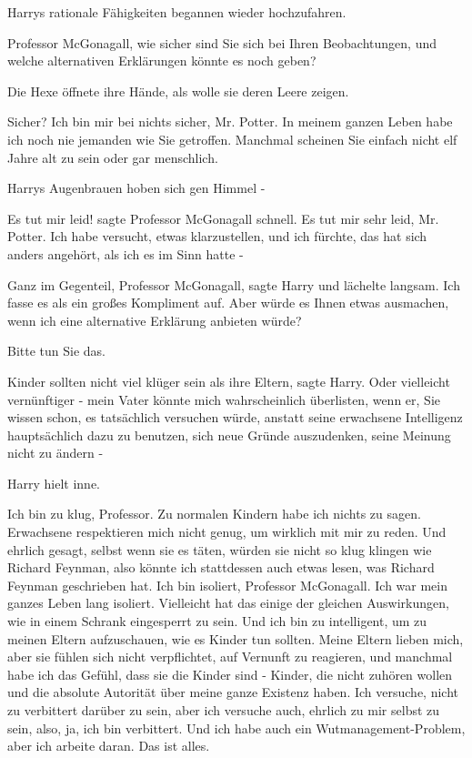Harrys rationale Fähigkeiten begannen wieder hochzufahren.

\glqq Professor McGonagall, wie sicher sind Sie sich bei Ihren Beobachtungen,
und welche alternativen Erklärungen könnte es noch geben?\grqq{}

Die Hexe öffnete ihre Hände, als wolle sie deren Leere zeigen.

\glqq Sicher? Ich bin mir bei nichts sicher, Mr. Potter. In meinem ganzen Leben
habe ich noch nie jemanden wie Sie getroffen. Manchmal scheinen Sie einfach
nicht elf Jahre alt zu sein oder gar menschlich.\grqq{}

Harrys Augenbrauen hoben sich gen Himmel -

\glqq Es tut mir leid!\grqq{} sagte Professor McGonagall schnell. \glqq Es tut
mir sehr leid, Mr. Potter. Ich habe versucht, etwas klarzustellen, und ich
fürchte, das hat sich anders angehört, als ich es im Sinn hatte -\grqq{}

\glqq Ganz im Gegenteil, Professor McGonagall\grqq{}, sagte Harry und lächelte
langsam. \glqq Ich fasse es als ein großes Kompliment auf. Aber würde es Ihnen
etwas ausmachen, wenn ich eine alternative Erklärung anbieten würde?\grqq{}

\glqq Bitte tun Sie das.\grqq{}

\glqq Kinder sollten nicht viel klüger sein als ihre Eltern\grqq{}, sagte Harry.
\glqq Oder vielleicht vernünftiger - mein Vater könnte mich wahrscheinlich
überlisten, wenn er, Sie wissen schon, es tatsächlich versuchen würde, anstatt
seine erwachsene Intelligenz hauptsächlich dazu zu benutzen, sich neue Gründe
auszudenken, seine Meinung nicht zu ändern -\grqq{}

Harry hielt inne.

\glqq Ich bin zu klug, Professor. Zu normalen Kindern habe ich nichts zu sagen.
Erwachsene respektieren mich nicht genug, um wirklich mit mir zu reden. Und
ehrlich gesagt, selbst wenn sie es täten, würden sie nicht so klug klingen wie
Richard Feynman, also könnte ich stattdessen auch etwas lesen, was Richard
Feynman geschrieben hat. Ich bin isoliert, Professor McGonagall. Ich war mein
ganzes Leben lang isoliert. Vielleicht hat das einige der gleichen Auswirkungen,
wie in einem Schrank eingesperrt zu sein. Und ich bin zu intelligent, um zu
meinen Eltern aufzuschauen, wie es Kinder tun sollten. Meine Eltern lieben mich,
aber sie fühlen sich nicht verpflichtet, auf Vernunft zu reagieren, und manchmal
habe ich das Gefühl, dass sie die Kinder sind - Kinder, die nicht zuhören wollen
und die absolute Autorität über meine ganze Existenz haben. Ich versuche, nicht
zu verbittert darüber zu sein, aber ich versuche auch, ehrlich zu mir selbst zu
sein, also, ja, ich bin verbittert. Und ich habe auch ein Wutmanagement-Problem,
aber ich arbeite daran. Das ist alles.\grqq{}

